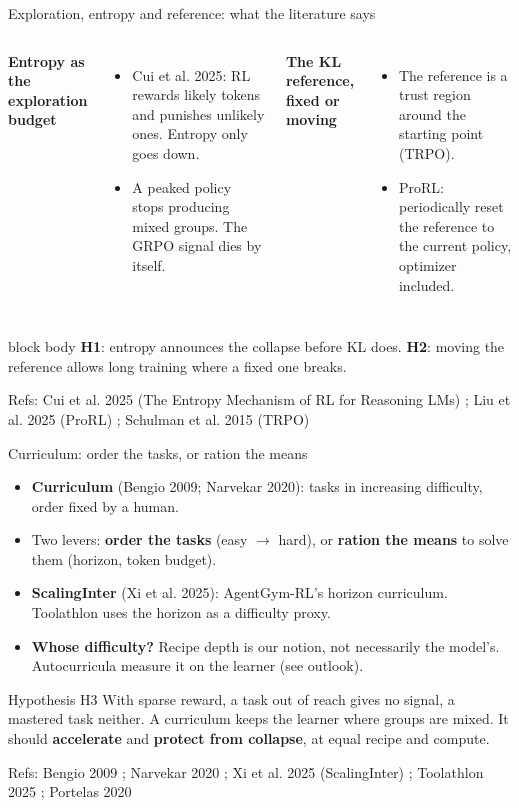 \documentclass[aspectratio=169,10pt]{beamer}
\newcommand{\refs}[1]{\vfill{\tiny\textcolor{crMid}{Refs: #1}}}
\newcommand{\hl}[1]{\textcolor{crOrange}{\textbf{#1}}}
\newenvironment{keymsg}{\begin{beamercolorbox}[sep=6pt,wd=\textwidth]{block body}\small}{\end{beamercolorbox}}
\begin{document}
\begin{frame}{Exploration, entropy and reference: what the literature says}
\begin{columns}[T]
\textbf{Entropy as the exploration budget}
\begin{itemize}
  \item Cui et al. 2025: RL rewards likely tokens and punishes unlikely ones. Entropy only goes down.
  \item A peaked policy stops producing mixed groups. The GRPO signal dies by itself.
\end{itemize}
\textbf{The KL reference, fixed or moving}
\begin{itemize}
  \item The reference is a trust region around the starting point (TRPO).
  \item ProRL: periodically reset the reference to the current policy, optimizer included.
\end{itemize}
\end{columns}
\vspace{0.2cm}
\begin{keymsg}
\hl{H1}: entropy announces the collapse before KL does. \hl{H2}: moving the reference allows long training where a fixed one breaks.
\end{keymsg}
\refs{Cui et al. 2025 (The Entropy Mechanism of RL for Reasoning LMs) ; Liu et al. 2025 (ProRL) ; Schulman et al. 2015 (TRPO)}
\end{frame}

\begin{frame}{Curriculum: order the tasks, or ration the means}
\begin{itemize}\setlength{\itemsep}{3pt}
  \item \textbf{Curriculum} (Bengio 2009; Narvekar 2020): tasks in increasing difficulty, order fixed by a human.
  \item Two levers: \hl{order the tasks} (easy $\to$ hard), or \hl{ration the means} to solve them (horizon, token budget).
  \item \textbf{ScalingInter} (Xi et al. 2025): AgentGym-RL's horizon curriculum. Toolathlon uses the horizon as a difficulty proxy.
  \item \textbf{Whose difficulty?} Recipe depth is our notion, not necessarily the model's. Autocurricula measure it on the learner (see outlook).
\end{itemize}
\vspace{0.2cm}
\begin{block}{Hypothesis H3}
With sparse reward, a task out of reach gives no signal, a mastered task neither. A curriculum keeps the learner where groups are mixed. It should \textbf{accelerate} and \textbf{protect from collapse}, at equal recipe and compute.
\end{block}
\refs{Bengio 2009 ; Narvekar 2020 ; Xi et al. 2025 (ScalingInter) ; Toolathlon 2025 ; Portelas 2020}
\end{frame}
\end{document}
